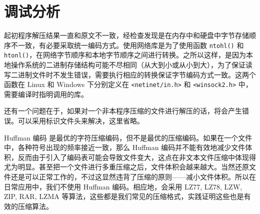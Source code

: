 \section{调试分析}

起初程序解压结果一直和原文不一致，经检查发现是在内存中和硬盘中字节存储顺序不一致，有必要采取统一编码方式。使用网络库是为了使用函数 \verb|ntohl()| 和 \verb|htonl()|，在网络字节顺序和本地字节顺序之间进行转换。之所以这样，是因为本地操作系统的二进制存储结构可能不尽相同（从大到小或从小到大），为了保证读写二进制文件时不发生错误，需要执行相应的转换保证字节编码方式一致。这两个函数在 Linux 和 Windows 下分别定义在 \verb|<netinet/in.h>| 和 \verb|<winsock2.h>| 中，需要编译时指明调用的库。

还有一个问题在于，如果对一个非本程序压缩的文件进行解压的话，将会产生错误。可以采用标识文件头来解决，这里省略。

Huffman 编码 \cite{huffman} 是最优的字符压缩编码，但不是最优的压缩编码。如果在一个文件中，各种符号出现的频率接近一致，那么 Huffman 编码并不能有效地减少文件体积，反而由于引入了编码表可能会导致文件变大，这点在非文本文件压缩中体现得尤为明显。甚至把一个文件进行多重压缩之后，文件体积会越来越大。当然还原文件还是可以正常工作的，不过这显然违背了压缩的原则——减小文件体积。所以在日常应用中，我们不使用 Huffman 编码。相应地，会采用 LZ77\cite{lz77}, LZ78\cite{lz78}, LZW\cite{lzw}, ZIP, RAR, LZMA 等算法，这些都是我们常见的压缩格式，实践证明这些也是有效的压缩算法。
